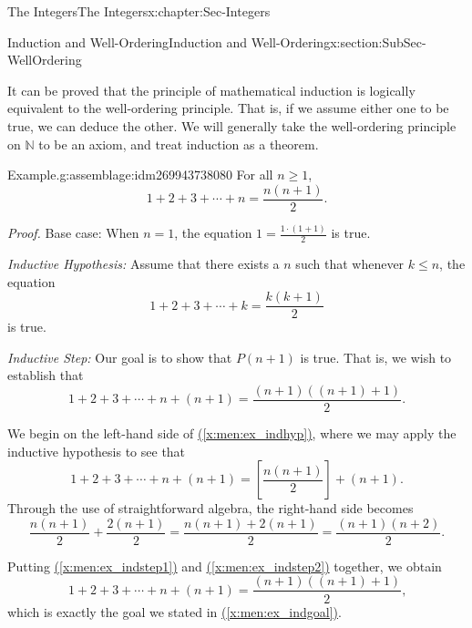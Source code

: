 \documentclass[oneside,10pt,]{book}
\numberwithin{equation}{section}
\renewcommand{\le}{\leqslant}
\renewcommand{\ge}{\geqslant}
\def\N{{\mathbb N}}
\begin{document}
\begin{chapterptx}{The Integers}{}{The Integers}{}{}{x:chapter:Sec-Integers}
\begin{sectionptx}{Induction and Well-Ordering}{}{Induction and Well-Ordering}{}{}{x:section:SubSec-WellOrdering}
\par
It can be proved that the principle of mathematical induction is logically equivalent to the well-ordering principle. That is, if we assume either one to be true, we can deduce the other. We will generally take the well-ordering principle on \(\N\) to be an axiom, and treat induction as a theorem.%
\begin{assemblage}{Example.}{g:assemblage:idm269943738080}%
For all \(n \ge 1\),%
\begin{equation*}
1+ 2 + 3 + \cdots + n = \frac{n(n+1)}{2}\text{.}
\end{equation*}
%
\par
\emph{Proof.} Base case: When \(n = 1\), the equation \(1 = \frac{1\cdot (1+1)}{2}\) is true.%
\par
\emph{Inductive Hypothesis:} Assume that there exists a \(n\) such that whenever \(k \le n\), the equation%
\begin{equation}
1+ 2 + 3 + \cdots + k = \frac{k(k+1)}{2}\label{x:men:ex_indhyp}
\end{equation}
is true.%
\par
\emph{Inductive Step:} Our goal is to show that \(P(n+1)\) is true. That is, we wish to establish that%
\begin{equation}
1+ 2 + 3 + \cdots + n + (n+1) = \frac{(n+1)((n+1)+1)}{2}\text{.}\label{x:men:ex_indgoal}
\end{equation}
%
\par
We begin on the left-hand side of \hyperref[x:men:ex_indhyp]{(\ref{x:men:ex_indhyp})}, where we may apply the inductive hypothesis to see that%
\begin{equation}
1+ 2 + 3 + \cdots + n + (n+1) = \left[\frac{n(n+1)}{2}\right] + (n+1)\text{.}\label{x:men:ex_indstep1}
\end{equation}
Through the use of straightforward algebra, the right-hand side becomes%
\begin{equation}
\frac{n(n+1)}{2} + \frac{2(n+1)}{2} = \frac{n(n+1) + 2(n+1)}{2} = \frac{(n+1)(n+2)}{2}\text{.}\label{x:men:ex_indstep2}
\end{equation}
%
\par
Putting \hyperref[x:men:ex_indstep1]{(\ref{x:men:ex_indstep1})} and \hyperref[x:men:ex_indstep2]{(\ref{x:men:ex_indstep2})} together, we obtain%
\begin{equation*}
1+ 2 + 3 + \cdots + n + (n+1) = \frac{(n+1)((n+1)+1)}{2}\text{,}
\end{equation*}
which is exactly the goal we stated in \hyperref[x:men:ex_indgoal]{(\ref{x:men:ex_indgoal})}.%

\end{assemblage}
\end{sectionptx}
\end{chapterptx}
\end{document}
